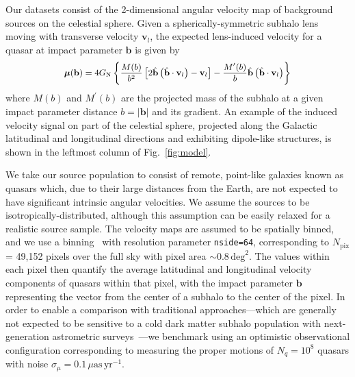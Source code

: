 \documentclass[]{article}
\begin{document}
Our datasets consist of the 2-dimensional angular velocity map of background sources on the celestial sphere. 
Given a spherically-symmetric subhalo lens moving with transverse velocity $\mathbf{v}_{l}$, the expected lens-induced velocity for a quasar at impact parameter $\mathbf{b}$ is given by~\citep{VanTilburg:2018ykj}
\begin{equation}
\small
\boldsymbol{\mu}(\mathbf{b})=4 G_{\mathrm{N}}\left\{\frac{M(b)}{b^{2}}\left[2 \hat{\mathbf{b}}\left(\hat{\mathbf{b}} \cdot \mathbf{v}_{l}\right)-\mathbf{v}_{l}\right]-\frac{M^{\prime}(b)}{b} \hat{\mathbf{b}}\left(\hat{\mathbf{b}} \cdot \mathbf{v}_{l}\right)\right\}
\end{equation}
where $M(b)$ and $M^{\prime}(b)$ are the projected mass of the subhalo at a given impact parameter distance $b = |\mathbf{b}|$ and its gradient. An example of the induced velocity signal on part of the celestial sphere, projected along the Galactic latitudinal and longitudinal directions and exhibiting dipole-like structures, is shown in the leftmost column of Fig.~\ref{fig:model}.

We take our source population to consist of remote, point-like galaxies known as quasars which, due to their large distances from the Earth, are not expected to have significant intrinsic angular velocities. We assume the sources to be isotropically-distributed, although this assumption can be easily relaxed for a realistic source sample. The velocity maps are assumed to be spatially binned, and we use  a \healpix binning~\citep{Gorski:2004by} with resolution parameter \texttt{nside=64}, corresponding to $N_\mathrm{pix}$ = 49,152 pixels over the full sky with pixel area $\sim 0.8\,\mathrm{deg}^2$. The values within each pixel then quantify the average latitudinal and longitudinal velocity components of quasars within that pixel, with the impact parameter $\mathbf b$ representing the vector from the center of a subhalo to the center of the pixel.
In order to enable a comparison with traditional approaches---which are generally not expected to be sensitive to a cold dark matter subhalo population with next-generation astrometric surveys~\citep{VanTilburg:2018ykj,Mishra-Sharma:2020ynk}---we benchmark using an optimistic observational configuration corresponding to measuring the proper motions of $N_q = 10^8$ quasars with noise $\sigma_{\mu} = 0.1\,\mu\mathrm{as}\,\mathrm{yr}^{-1}$.
\end{document}
